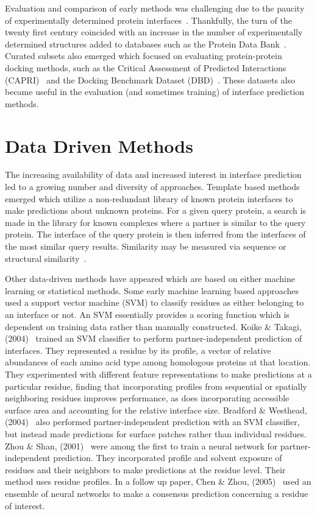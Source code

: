 Evaluation and comparison of early methods was challenging due to the paucity of experimentally determined protein interfaces~\cite{esmaielbeiki2015}.
Thankfully, the turn of the twenty first century coincided with an increase in the number of experimentally determined structures added to databases such as the Protein Data Bank~\cite{berman2000}.
Curated subsets also emerged which focused on evaluating protein-protein docking methods, such as the Critical Assessment of Predicted Interactions (CAPRI)~\cite{janin2003} and the Docking Benchmark Dataset (DBD)~\cite{chen2002}.
These datasets also became useful in the evaluation (and sometimes training) of interface prediction methods.

\section{Data Driven Methods}
	
The increasing availability of data and increased interest in interface prediction led to a growing number and diversity of approaches.
Template based methods emerged which utilize a non-redundant library of known protein interfaces to make predictions about unknown proteins.
For a given query protein, a search is made in the library for known complexes where a partner is similar to the query protein.
The interface of the query protein is then inferred from the interfaces of the most similar query results.
Similarity may be measured via sequence or structural similarity~\cite{esmaielbeiki2015}.

Other data-driven methods have appeared which are based on either machine learning or statistical methods.
Some early machine learning based approaches used a support vector machine (SVM) to classify residues as either belonging to an interface or not.
An SVM essentially provides a scoring function which is dependent on training data rather than manually constructed.
Koike \& Takagi, (2004)~\cite{koike2004} trained an SVM classifier to perform partner-independent prediction of interfaces.
They represented a residue by its profile, a vector of relative abundances of each amino acid type among homologous proteins at that location.
They experimented with different feature representations to make predictions at a particular residue, finding that incorporating profiles from sequential or spatially neighboring residues improves performance, as does incorporating accessible surface area and accounting for the relative interface size.
Bradford \& Westhead, (2004)~\cite{bradford2004} also performed partner-independent prediction with an SVM classifier, but instead made predictions for surface patches rather than individual residues.
Zhou \& Shan, (2001)~\cite{zhou2001} were among the first to train a neural network for partner-independent prediction.
They incorporated profile and solvent exposure of residues and their neighbors to make predictions at the residue level.
Their method uses residue profiles.
In a follow up paper, Chen \& Zhou, (2005)~\cite{chen2005} used an ensemble of neural networks to make a consensus prediction concerning a residue of interest.

